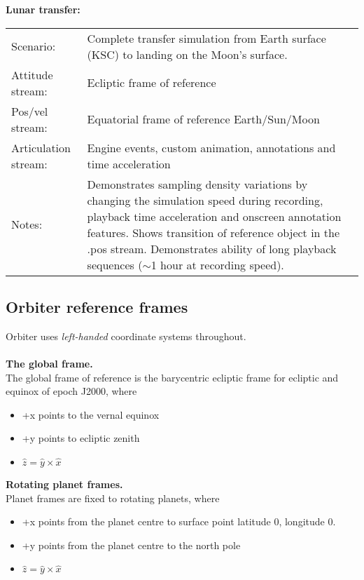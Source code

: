 \documentclass[Orbiter Technical Reference.tex]{subfiles}
\begin{document}
\noindent
\textbf{Lunar transfer:}
\begin{table}[H]
	\centering
	\begin{tabularx}{\textwidth}{ l X }
	Scenario: & Complete transfer simulation from Earth surface (KSC) to landing on the Moon's surface.\\
	Attitude stream: & Ecliptic frame of reference\\
	Pos/vel stream: & Equatorial frame of reference Earth/Sun/Moon\\
	Articulation stream: & Engine events, custom animation, annotations and time acceleration\\
	Notes: & Demonstrates sampling density variations by changing the simulation speed during recording, playback time acceleration and onscreen annotation features. Shows transition of reference object in the .pos stream. Demonstrates ability of long playback sequences ($\sim$1 hour at recording speed).\\
	\end{tabularx}
\end{table}


\subsection{Orbiter reference frames}
Orbiter uses \textit{left-handed} coordinate systems throughout.\\
\\
\textbf{The global frame.}\\
The global frame of reference is the barycentric ecliptic frame for ecliptic and equinox of epoch J2000, where

\begin{itemize}
\item +x points to the vernal equinox
\item +y points to ecliptic zenith
\item $\hat{z} = \hat{y} \times \hat{x}$
\end{itemize}

\noindent
\textbf{Rotating planet frames.}\\
Planet frames are fixed to rotating planets, where

\begin{itemize}
\item +x points from the planet centre to surface point latitude 0, longitude 0.
\item +y points from the planet centre to the north pole
\item $\hat{z} = \hat{y} \times \hat{x}$
\end{itemize}
\end{document}
